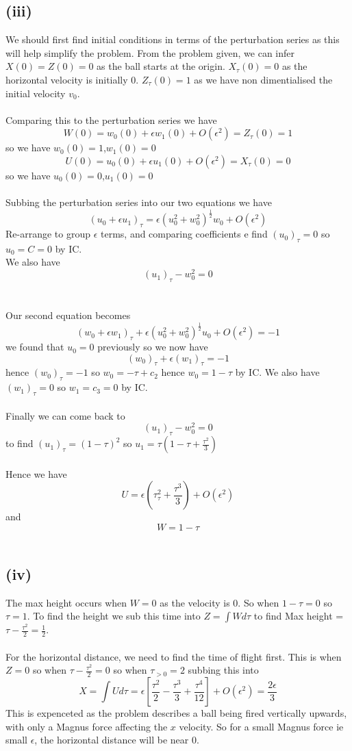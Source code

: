 \documentclass[1pt]{article}
\begin{document}
\subsection*{(iii)}
We should first find initial conditions in terms of the perturbation series as this will help simplify the problem. From the problem given, we can infer $X(0)=Z(0)=0$ as the ball starts at the origin. $X_{\tau}(0)=0$ as the horizontal velocity is initially $0$. $Z_{\tau}(0)=1$ as we have non dimentialised the initial velocity $v_0$.
\\
\\ Comparing this to the perturbation series we have $$W(0)=w_0(0)+\epsilon w_1(0)+O(\epsilon^2)=Z_{\tau}(0)=1$$ so we have $w_0(0)=1$,$w_1(0)=0$
\\ $$U(0)=u_0(0)+\epsilon u_1(0)+O(\epsilon^2)=X_{\tau}(0)=0$$ so we have $u_0(0)=0$,$u_1(0)=0$
\\
\\ Subbing the perturbation series into our two equations we have 
$$(u_0+\epsilon u_1)_{\tau}=\epsilon(u_0^2+w_0^2)^{\frac{1}{2}}w_0+O(\epsilon^2)$$
Re-arrange to group $\epsilon$ terms, and comparing coefficients e find $(u_0)_{\tau}=0$ so $u_0=C=0$ by IC.
\\ We also have $$(u_1)_{\tau}-w_0^2=0$$
\\
\\ Our second equation becomes $$(w_0+\epsilon w_1)_{\tau}+\epsilon(u_0^2+w_0^2)^{\frac{1}{2}}u_0+O(\epsilon^2)=-1$$ we found that $u_0=0$ previously so we now have $$(w_0)_{\tau}+\epsilon (w_1)_{\tau}=-1$$ hence $(w_0)_{\tau}=-1$ so $w_0=-\tau+c_2$ hence $w_0=1-\tau$ by IC. We also have $(w_1)_{\tau}=0$ so $w_1=c_3=0$ by IC.
\\
\\ Finally we can come back to $$(u_1)_{\tau}-w_0^2=0$$ to find $(u_1)_{\tau}=(1-\tau)^2$ so $u_1=\tau(1-\tau+\frac{\tau^2}{3})$
\\
\\ Hence we have $$U=\epsilon(\tau_\tau^2+\frac{\tau^3}{3})+O(\epsilon^2)$$ and $$W=1-\tau$$
\\
\subsection*{(iv)}
The max height occurs when $W=0$ as the velocity is $0$. So when $1-\tau=0$ so $\tau=1$. To find the height we sub this time into $Z=\int W d\tau$ to find Max height = $\tau-\frac{\tau^2}{2}=\frac{1}{2}$. 
\\
\\ For the horizontal distance, we need to find the time of flight first. This is when $Z=0$ so when $\tau-\frac{\tau^2}{2}=0$ so when $\tau_{>0}=2$ subbing this into $$X=\int U d\tau = \epsilon[\frac{\tau^2}{2}-\frac{\tau^3}{3}+\frac{\tau^4}{12}]+O(\epsilon^2)=\frac{2\epsilon}{3}$$ This is expenceted as the problem describes a ball being fired vertically upwards, with only a Magnus force affecting the $x$ velocity. So for a small Magnus force ie small $\epsilon$, the horizontal distance will be near 0.
\end{document}
